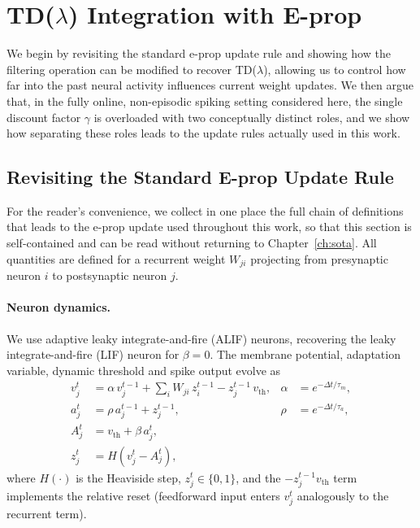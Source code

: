 \section{TD($\lambda$) Integration with E-prop}

We begin by revisiting the standard e-prop update rule and showing how the
filtering operation can be modified to recover TD($\lambda$), allowing us to
control how far into the past neural activity influences current weight
updates. We then argue that, in the fully online, non-episodic spiking setting
considered here, the single discount factor $\gamma$ is overloaded with two
conceptually distinct roles, and we show how separating these roles leads to
the update rules actually used in this work.
\subsection{Revisiting the Standard E-prop Update Rule}
\label{sec:revisit-eprop}
For the reader's convenience, we collect in one place the full chain of
definitions that leads to the e-prop update used throughout this work, so that
this section is self-contained and can be read without returning to
Chapter~\ref{ch:sota}. All quantities are defined for a recurrent weight
$W_{ji}$ projecting from presynaptic neuron $i$ to postsynaptic neuron $j$.

\paragraph{Neuron dynamics.}
We use adaptive leaky integrate-and-fire (ALIF) neurons, recovering the
leaky integrate-and-fire (LIF) neuron for $\beta = 0$. The membrane potential,
adaptation variable, dynamic threshold and spike output evolve as
\begin{align}
v^t_j &= \alpha\, v^{t-1}_j + \sum_i W_{ji}\, z^{t-1}_i - z^{t-1}_j\, v_{\mathrm{th}},
   & \alpha &= e^{-\Delta t/\tau_m}, \label{eq:alif-v}\\
a^t_j &= \rho\, a^{t-1}_j + z^{t-1}_j,
   & \rho   &= e^{-\Delta t/\tau_a}, \label{eq:alif-a}\\
A^t_j &= v_{\mathrm{th}} + \beta\, a^t_j, \label{eq:alif-thresh}\\
z^t_j &= H\!\left(v^t_j - A^t_j\right), \label{eq:alif-spike}
\end{align}
where $H(\cdot)$ is the Heaviside step, $z^t_j \in \{0,1\}$, and the
$-z^{t-1}_j v_{\mathrm{th}}$ term implements the relative reset (feedforward
input enters $v^t_j$ analogously to the recurrent term).

